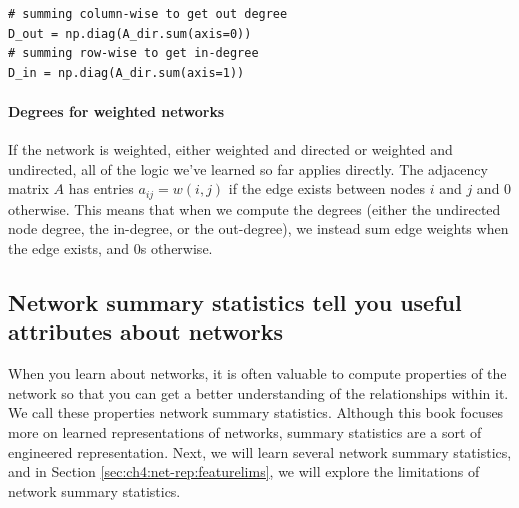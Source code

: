 \begin{lstlisting}[style=python]
# summing column-wise to get out degree
D_out = np.diag(A_dir.sum(axis=0))
# summing row-wise to get in-degree
D_in = np.diag(A_dir.sum(axis=1))
\end{lstlisting}

\paragraph*{Degrees for weighted networks}

If the network is weighted, either weighted and directed or weighted and undirected, all of the logic we've learned so far applies directly. The adjacency matrix $A$ has entries $a_{ij} = w(i, j)$ if the edge exists between nodes $i$ and $j$ and $0$ otherwise. This means that when we compute the degrees (either the undirected node degree, the in-degree, or the out-degree), we instead sum edge weights when the edge exists, and $0$s otherwise.

\subsection{Network summary statistics tell you useful attributes about networks}

When you learn about networks, it is often valuable to compute properties of the network so that you can get a better understanding of the relationships within it. We call these properties {network summary statistics}. Although this book focuses more on {learned} representations of networks, summary statistics are a sort of {engineered} representation. Next, we will learn several network summary statistics, and in Section \ref{sec:ch4:net-rep:featurelims}, we will explore the limitations of network summary statistics.


